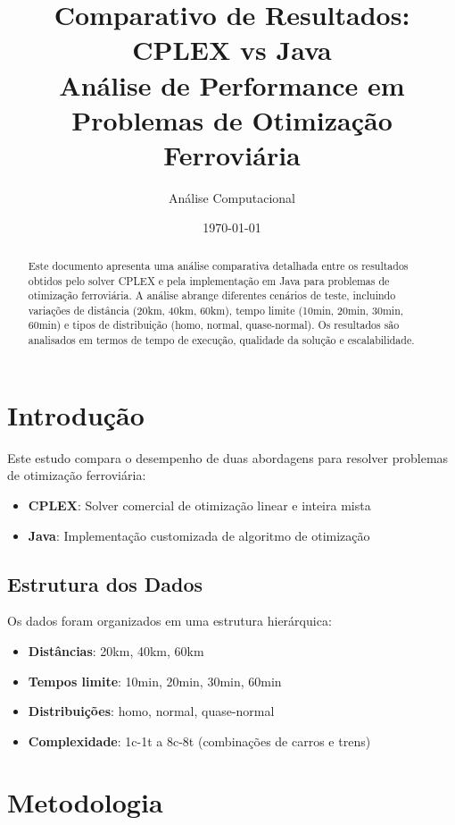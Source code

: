 \documentclass[12pt,a4paper]{article}
\title{\textbf{Comparativo de Resultados: CPLEX vs Java}\\
\large Análise de Performance em Problemas de Otimização Ferroviária}
\author{Análise Computacional}
\date{\today}
\begin{document}
\maketitle

\begin{abstract}
Este documento apresenta uma análise comparativa detalhada entre os resultados obtidos pelo solver CPLEX e pela implementação em Java para problemas de otimização ferroviária. A análise abrange diferentes cenários de teste, incluindo variações de distância (20km, 40km, 60km), tempo limite (10min, 20min, 30min, 60min) e tipos de distribuição (homo, normal, quase-normal). Os resultados são analisados em termos de tempo de execução, qualidade da solução e escalabilidade.
\end{abstract}

\tableofcontents
\newpage

\section{Introdução}

Este estudo compara o desempenho de duas abordagens para resolver problemas de otimização ferroviária:

\begin{itemize}
    \item \textbf{CPLEX}: Solver comercial de otimização linear e inteira mista
    \item \textbf{Java}: Implementação customizada de algoritmo de otimização
\end{itemize}

\subsection{Estrutura dos Dados}

Os dados foram organizados em uma estrutura hierárquica:

\begin{itemize}
    \item \textbf{Distâncias}: 20km, 40km, 60km
    \item \textbf{Tempos limite}: 10min, 20min, 30min, 60min
    \item \textbf{Distribuições}: homo, normal, quase-normal
    \item \textbf{Complexidade}: 1c-1t a 8c-8t (combinações de carros e trens)
\end{itemize}

\section{Metodologia}
\end{document}
